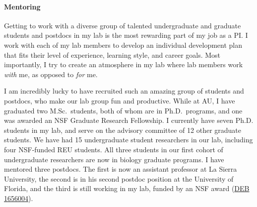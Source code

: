 \paragraph*{Mentoring}
Getting to work with a diverse group of talented undergraduate and graduate
students and postdocs in my lab is the most rewarding part of my job as a
PI.
I work with each of my lab members to develop an individual development
plan that fits
their level of experience, learning style, and career goals.
Most importantly, I try to create an atmosphere in my lab where
lab members work \emph{with} me, as opposed to \emph{for} me.

I am incredibly lucky to have recruited such an amazing group of students and
postdocs, who make
our lab group fun and productive.
While at AU, I have graduated two M.Sc.\ students, both of whom are in Ph.D.\
programs, and one was awarded an NSF Graduate Research Fellowship.
I currently have seven Ph.D. students in my lab, and serve on the advisory
committee of 12 other graduate students.
We have had 15 undergraduate student researchers in our lab, including four
NSF-funded REU students.
All three students in our first cohort of undergraduate researchers are now in
biology graduate programs.
I have mentored three postdocs.
The first is now an assistant professor at La Sierra University, the second is
in his second postdoc position at the University of Florida, and the third is
still working in my lab, funded by an NSF award
(\href{https://www.nsf.gov/awardsearch/showAward?AWD_ID=1656004&HistoricalAwards=false}{DEB 1656004}).
